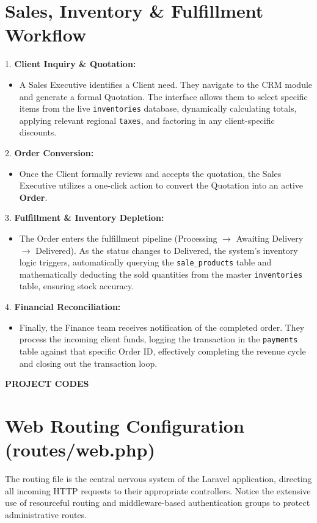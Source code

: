 ﻿\documentclass[12pt,a4paper]{report}
\begin{document}
\section*{Sales, Inventory \& Fulfillment Workflow}
1. \textbf{Client Inquiry \& Quotation:}
    \begin{itemize}
        \item A Sales Executive identifies a Client need. They navigate to the CRM module and generate a formal Quotation. The interface allows them to select specific items from the live \texttt{inventories} database, dynamically calculating totals, applying relevant regional \texttt{taxes}, and factoring in any client-specific discounts.
    \end{itemize}
2. \textbf{Order Conversion:}
    \begin{itemize}
        \item Once the Client formally reviews and accepts the quotation, the Sales Executive utilizes a one-click action to convert the Quotation into an active \textbf{Order}.
    \end{itemize}
3. \textbf{Fulfillment \& Inventory Depletion:}
    \begin{itemize}
        \item The Order enters the fulfillment pipeline (Processing $\rightarrow$ Awaiting Delivery $\rightarrow$ Delivered). As the status changes to Delivered, the system's inventory logic triggers, automatically querying the \texttt{sale\_products} table and mathematically deducting the sold quantities from the master \texttt{inventories} table, ensuring stock accuracy.
    \end{itemize}
4. \textbf{Financial Reconciliation:}
    \begin{itemize}
        \item Finally, the Finance team receives notification of the completed order. They process the incoming client funds, logging the transaction in the \texttt{payments} table against that specific Order ID, effectively completing the revenue cycle and closing out the transaction loop.
    \end{itemize}

\newpage
\vspace*{\fill}
\begin{center}
{\LARGE \textbf{PROJECT CODES}}
\end{center}
\vspace*{\fill}
\newpage

\section*{Web Routing Configuration (routes/web.php)}
The routing file is the central nervous system of the Laravel application, directing all incoming HTTP requests to their appropriate controllers. Notice the extensive use of resourceful routing and middleware-based authentication groups to protect administrative routes.
\end{document}

